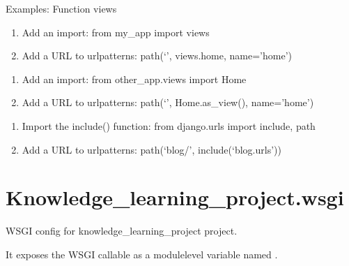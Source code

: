 \documentclass[letterpaper,10pt,english]{sphinxmanual}
\begin{document}
\sphinxAtStartPar
Examples:
Function views
\begin{enumerate}
%
\item {} 
\sphinxAtStartPar
Add an import:  from my\_app import views

\item {} 
\sphinxAtStartPar
Add a URL to urlpatterns:  path(‘’, views.home, name=’home’)

\end{enumerate}
\begin{description}
\begin{enumerate}
%
\item {} 
\sphinxAtStartPar
Add an import:  from other\_app.views import Home

\item {} 
\sphinxAtStartPar
Add a URL to urlpatterns:  path(‘’, Home.as\_view(), name=’home’)

\end{enumerate}

\begin{enumerate}
%
\item {} 
\sphinxAtStartPar
Import the include() function: from django.urls import include, path

\item {} 
\sphinxAtStartPar
Add a URL to urlpatterns:  path(‘blog/’, include(‘blog.urls’))

\end{enumerate}

\end{description}


\section{Knowledge\_learning\_project.wsgi}
\label{\detokenize{knowledge_learning_project:module-knowledge_learning_project.wsgi}}\label{\detokenize{knowledge_learning_project:knowledge-learning-project-wsgi}}
\sphinxAtStartPar
WSGI config for knowledge\_learning\_project project.

\sphinxAtStartPar
It exposes the WSGI callable as a module\sphinxhyphen{}level variable named .
\end{document}
